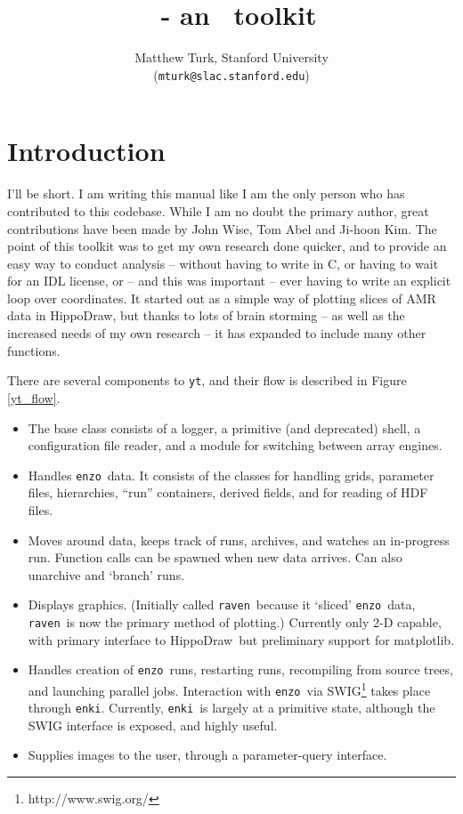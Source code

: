 \documentclass{article}
\title{\yt\ - an \enzo\ toolkit}
\author{Matthew Turk, Stanford University \\(\texttt{mturk@slac.stanford.edu})}
\newcommand{\fido}{\texttt{fido}}
\newcommand{\lagos}{\texttt{lagos}}
\newcommand{\raven}{\texttt{raven}}
\newcommand{\ndel}{\texttt{deliverator}}
\newcommand{\enki}{\texttt{enki}}
\newcommand{\enzo}{\texttt{enzo}}
\newcommand{\yt}{\texttt{yt}}
\newcommand{\hd}{HippoDraw}
\begin{document}
\maketitle
\tableofcontents
\clearpage
\section{Introduction}
I'll be short.  I am writing this manual like I am the only person who has
contributed to this codebase.  While I am no doubt the primary author, great
contributions have been made by John Wise, Tom Abel and Ji-hoon Kim.  The point
of this toolkit was to get my own research done quicker, and to provide an easy
way to conduct analysis -- without having to write in C, or having to wait for
an IDL license, or -- and this was important -- ever having to write an
explicit loop over coordinates.  It started out as a simple way of plotting
slices of AMR data in \hd, but thanks to lots of brain storming -- as well as
the increased needs of my own research -- it has expanded to include many other
functions.

There are several components to \yt, and their flow is described in Figure
\ref{yt_flow}.

\begin{itemize}
\item[\yt] The base class consists of a logger, a primitive (and deprecated)
shell, a configuration file reader, and a module for switching between array
engines.
\item[\lagos] Handles \enzo\ data.  It consists of the
classes for handling grids, parameter files, hierarchies, ``run'' containers,
derived fields, and for reading of HDF files.
\item[\fido] Moves around data, keeps track of runs, archives, and watches an
in-progress run.  Function calls can be spawned when new data arrives.  Can
also unarchive and `branch' runs.
\item[\raven] Displays graphics.  (Initially called \raven\ because it `sliced'
\enzo\ data, \raven\ is now the primary method of plotting.)  Currently only
2-D capable, with primary interface to \hd\ but preliminary support for
matplotlib.
\item[\enki] Handles creation of \enzo\ runs, restarting runs, recompiling from
source trees, and launching parallel jobs.  Interaction with \enzo\ via
SWIG\footnote{http://www.swig.org/} takes
place through \enki.  Currently, \enki\ is largely at a primitive state, although
the SWIG interface is exposed, and highly useful.
\item[\ndel] Supplies images to the user, through a parameter-query interface.
\end{itemize}
\end{document}
